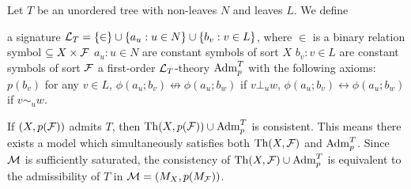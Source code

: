 \begin{definition}
\label{def:adm}
Let $T$ be an unordered tree with non-leaves $N$ and leaves $L$. We define 
    \begin{outline}
        \1 a signature $\mathcal{L}_T = \{\in\} \cup \{a_u : u\in N\} \cup \{b_v : v\in L\}$, where 
            \2 $\in$ is a binary relation symbol $\subseteq X \times \mathcal{F}$
            \2 ${a_u : u \in N}$ are constant symbols of sort $X$
            \2 ${b_v : v \in L}$ are constant symbols of sort $\mathcal{F}$
        \1 a first-order $\mathcal{L}_T$-theory $\operatorname{Adm}^{T}_{p}$ with the following axioms:
            \2[(1)] $p(b_v)$ for any $v\in L$,
            \2[(2)] $\phi(a_u;b_v)\not\leftrightarrow \phi(a_u;b_w)$ if $v\bot_u w$,
            \2[(3)] $\phi(a_u;b_v)\leftrightarrow \phi(a_u;b_w)$ if $v\sim_u w$.
    \end{outline}
\end{definition}

If $(X,p(\mathcal{F}))$ admits $T$, then $\operatorname{Th}(X,p(\mathcal{F}))\cup \operatorname{Adm}^{T}_{p}$ is consistent. This means there exists a model which simultaneously satisfies both $\operatorname{Th}(X,\mathcal{F})$ and $\operatorname{Adm}^{T}_{p}$.
Since $\mathcal{M}$ is sufficiently saturated, the consistency of $\operatorname{Th}(X,\mathcal{F})\cup \operatorname{Adm}^{T}_{p}$ is equivalent to the admissibility of $T$ in $\mathcal{M}=(M_X, p(M_{\mathcal{F}}))$.

